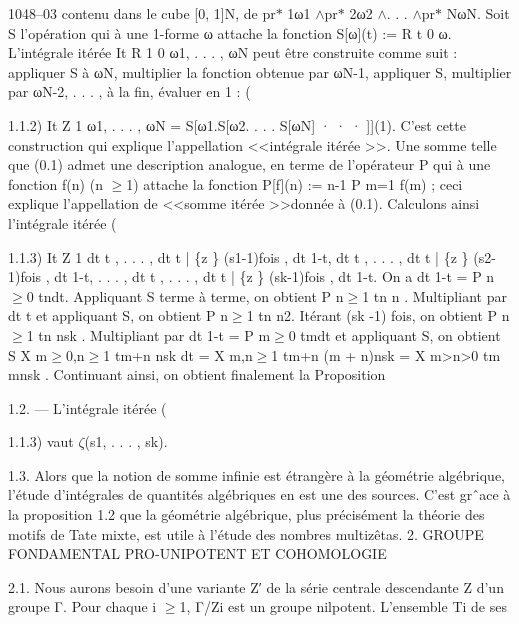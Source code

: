 \documentclass[11pt]{article}
\begin{document}
1048--03 contenu dans le cube [0, 1]N, de pr\(*\) 1ω1 \(\wedge\)pr\(*\) 2ω2 \(\wedge\). . . \(\wedge\)pr\(*\) NωN. Soit S l’opération qui à une 1-forme ω attache la fonction S[ω](t) := R t 0 ω. L’intégrale itérée It R 1 0 ω1, . . . , ωN peut être construite comme suit : appliquer S à ωN, multiplier la fonction obtenue par ωN-1, appliquer S, multiplier par ωN-2, . . . , à la fin, évaluer en 1 : (

1.1.2) It Z 1 ω1, . . . , ωN = S[ω1.S[ω2. . . . S[ωN] · · · ]](1). C’est cette construction qui explique l’appellation <<intégrale itérée >>. Une somme telle que (0.1) admet une description analogue, en terme de l’opérateur P qui à une fonction f(n) (n \(\ge\)1) attache la fonction P[f](n) := n-1 P m=1 f(m) ; ceci explique l’appellation de <<somme itérée >>donnée à (0.1). Calculons ainsi l’intégrale itérée (

1.1.3) It Z 1 dt t , . . . , dt t | \{z \} (s1-1)fois , dt 1-t, dt t , . . . , dt t | \{z \} (s2-1)fois , dt 1-t, . . . , dt t , . . . , dt t | \{z \} (sk-1)fois , dt 1-t. On a dt 1-t = P n\(\ge\)0 tndt. Appliquant S terme à terme, on obtient P n\(\ge\)1 tn n . Multipliant par dt t et appliquant S, on obtient P n\(\ge\)1 tn n2. Itérant (sk -1) fois, on obtient P n\(\ge\)1 tn nsk . Multipliant par dt 1-t = P m\(\ge\)0 tmdt et appliquant S, on obtient S  X m\(\ge\)0,n\(\ge\)1 tm+n nsk dt  = X m,n\(\ge\)1 tm+n (m + n)nsk = X m>n>0 tm mnsk . Continuant ainsi, on obtient finalement la Proposition 

1.2. --- L’intégrale itérée (

1.1.3) vaut \(\zeta\)(s1, . . . , sk). 

1.3. Alors que la notion de somme infinie est étrangère à la géométrie algébrique, l’étude d’intégrales de quantités algébriques en est une des sources. C’est grˆace à la proposition 1.2 que la géométrie algébrique, plus précisément la théorie des motifs de Tate mixte, est utile à l’étude des nombres multizêtas. 2. GROUPE FONDAMENTAL PRO-UNIPOTENT ET COHOMOLOGIE 

2.1. Nous aurons besoin d’une variante Z′ de la série centrale descendante Z d’un groupe Γ. Pour chaque i \(\ge\)1, Γ/Zi est un groupe nilpotent. L’ensemble Ti de ses
\end{document}
